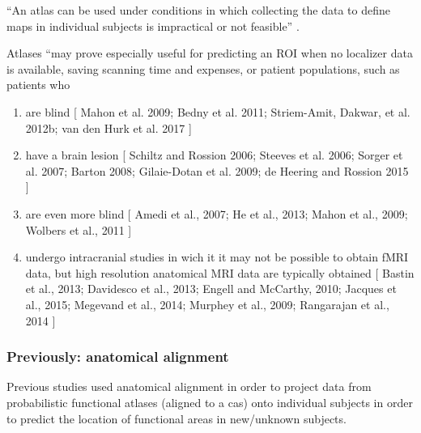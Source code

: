 %
``An atlas can be used under conditions in which collecting the data to define
maps in individual subjects is impractical or not feasible''
\citep{wang2015probabilistic}.

%
Atlases ``may prove especially useful for predicting an ROI when no localizer
data is available, saving scanning time and expenses, or
%
patient populations, such as patients who
%
\begin{enumerate}

\item are blind [
        Mahon et al. 2009;
        Bedny et al. 2011;
        Striem-Amit, Dakwar, et al. 2012b;
        van den Hurk et al. 2017
    ] \citep{rosenke2021probabilistic}

\item have a brain lesion [
        Schiltz and Rossion 2006;
        Steeves et al. 2006;
        Sorger et al. 2007;
        Barton 2008;
        Gilaie-Dotan et al. 2009;
        de Heering and Rossion 2015
    ] \citep{rosenke2021probabilistic}

\item are even more blind [
        Amedi et al., 2007;
        He et al., 2013;
        Mahon et al., 2009;
        Wolbers et al., 2011
    ] \citep{weiner2018defining}

\item undergo intracranial studies in wich it it may not be possible to obtain
    fMRI data, but high resolution anatomical MRI data are typically obtained [
        Bastin et al., 2013;
        Davidesco et al., 2013;
        Engell and McCarthy, 2010;
        Jacques et al., 2015;
        Megevand et al., 2014;
        Murphey et al., 2009;
        Rangarajan et al., 2014
    ] \citep{weiner2018defining}

\end{enumerate}


\subsubsection{Previously: anatomical alignment}
%
Previous studies used anatomical alignment in order to project data from
probabilistic functional atlases (aligned to a \ac{cas}) onto individual
subjects in order to predict the location of functional areas in new/unknown
subjects.



